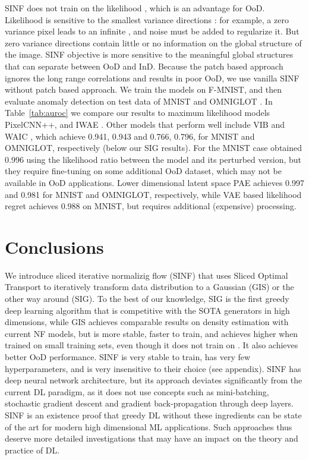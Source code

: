 \documentclass{article}
\begin{document}
SINF does not train on the likelihood , which is an advantage for OoD. 
Likelihood is sensitive to the smallest variance directions \citep{ren2019likelihood}: for example, a zero variance pixel leads to an infinite , and noise must be added to regularize it. But zero variance directions contain little or no information on the global structure of the image. SINF objective is more sensitive to the meaningful global structures that can separate between OoD and InD. Because the patch based approach ignores the long range correlations and results in poor OoD, we use vanilla SINF without patch based approach. We train the models on F-MNIST, and then evaluate anomaly detection on test data of MNIST and OMNIGLOT \citep{lake2015human}. 
In Table~\ref{tab:auroc} we compare our results to maximum likelihood  models PixelCNN++\citep{salimans2017pixelcnn++, ren2019likelihood}, 
and IWAE \citep{choi2018waic}. Other models that perform well 
include VIB and WAIC \citep{choi2018waic}, which achieve 0.941, 0.943 and 0.766, 0.796, for MNIST and OMNIGLOT, respectively (below our SIG results). 
For the MNIST case \citet{ren2019likelihood} obtained 0.996 using the likelihood ratio between the model and its perturbed version, but they require fine-tuning on some additional OoD dataset, which may not be available in OoD applications. Lower dimensional latent space PAE \citep{bohm2020probabilistic} achieves 0.997 and 0.981 for MNIST and OMNIGLOT, respectively, while VAE based 
likelihood regret \citep{xiao2020likelihood} achieves
0.988 on MNIST, but requires additional (expensive)
processing. 

\section{Conclusions}

We introduce sliced iterative normalizig flow (SINF) that uses
Sliced Optimal Transport to iteratively transform data distribution to a Gaussian (GIS) or the other way around (SIG). To the best of our knowledge, SIG is the first greedy deep learning algorithm that is competitive with the SOTA generators in high dimensions, while GIS achieves comparable results on density estimation with current NF models, but is more stable, faster to train, and achieves higher  when trained on small training sets, even though it does not train on . It also achieves better OoD performance. SINF is very stable to train, has very few hyperparameters, and is very insensitive to their choice (see appendix).
SINF has deep neural network architecture, but its approach deviates significantly from the current DL paradigm, as it does not use concepts such as mini-batching, stochastic gradient descent and gradient back-propagation through deep layers. 
SINF is an existence proof that greedy DL without these ingredients can be state of the art for modern high dimensional ML applications. Such approaches thus deserve more detailed investigations that may have an impact on the theory and practice of DL. 
\end{document}
